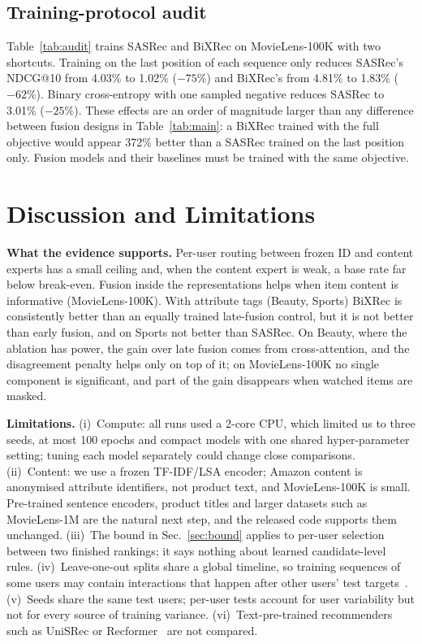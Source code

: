 \documentclass[conference]{IEEEtran}
\begin{document}
\subsection{Training-protocol audit}\label{sec:audit}
\tabAudit
Table~\ref{tab:audit} trains SASRec and BiXRec on MovieLens-100K with two shortcuts. Training on the last position of
each sequence only reduces SASRec's NDCG@10 from 4.03\% to 1.02\% ($-75\%$) and BiXRec's from 4.81\% to 1.83\%
($-62\%$). Binary cross-entropy with one sampled negative reduces SASRec to 3.01\% ($-25\%$). These effects are an
order of magnitude larger than any difference between fusion designs in Table~\ref{tab:main}: a BiXRec trained with
the full objective would appear 372\% better than a SASRec trained on the last position only. Fusion models and their
baselines must be trained with the same objective.

\section{Discussion and Limitations}\label{sec:limits}

\textbf{What the evidence supports.} Per-user routing between frozen ID and content experts has a small ceiling and,
when the content expert is weak, a base rate far below break-even. Fusion inside the representations helps when
item content is informative (MovieLens-100K). With attribute tags (Beauty, Sports) BiXRec is consistently better
than an equally trained late-fusion control, but it is not better than early fusion, and on Sports not better than
SASRec. On Beauty, where the ablation has power, the gain over late fusion comes from cross-attention, and the
disagreement penalty helps only on top of it; on MovieLens-100K no single component is significant, and part of the
gain disappears when watched items are masked.

\textbf{Limitations.} (i)~Compute: all runs used a 2-core CPU, which limited us to three seeds, at most 100 epochs
and compact models with one shared hyper-parameter setting; tuning each model separately could change close
comparisons. (ii)~Content: we use a frozen TF-IDF/LSA encoder; Amazon content is anonymised attribute identifiers,
not product text, and MovieLens-100K is small. Pre-trained sentence encoders, product titles and larger datasets
such as MovieLens-1M are the natural next step, and the released code supports them unchanged. (iii)~The bound in
Sec.~\ref{sec:bound} applies to per-user selection between two finished rankings; it says nothing about learned
candidate-level rules. (iv)~Leave-one-out splits share a global timeline, so training sequences of some users may
contain interactions that happen after other users' test targets~\cite{ji2023leakage}. (v)~Seeds share the same
test users; per-user tests account for user variability but not for every source of training variance.
(vi)~Text-pre-trained recommenders such as UniSRec or Recformer~\cite{hou2022unisrec,li2023recformer} are not
compared.
\end{document}
